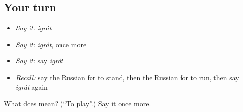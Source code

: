 \subsection*{Your turn}
\begin{itemize}
\raggedright
  \item \emph{Say it:} \emph{igrát}
  \item \emph{Say it:} \emph{igrát}, once more
  \item \emph{Say it:} say \emph{igrát}
  \item \emph{Recall:} say the Russian for to stand, then the Russian for to run, then say \emph{igrát} again
\end{itemize}

\begin{tcolorbox}[breakable,colback=teal!4,colframe=teal!35!black,title={Before you move on}]
What does  mean? (\textquotedblleft{}To play\textquotedblright{}.) Say it once more.
\end{tcolorbox}
